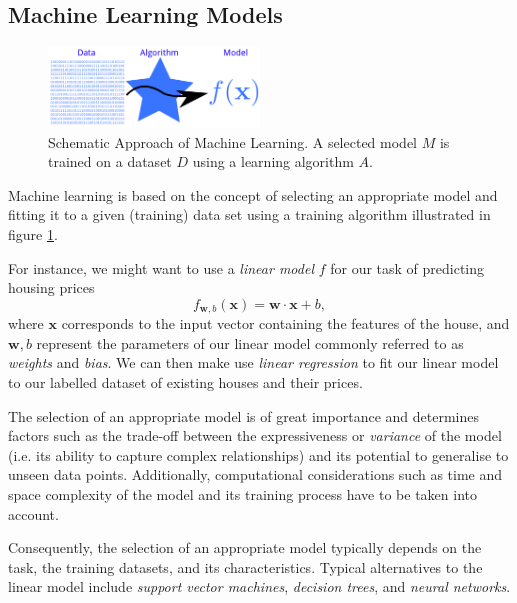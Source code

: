 \subsection{Machine Learning Models}
\begin{figure}[h]
	\caption{Schematic Approach of Machine Learning. A selected model $M$ is trained on a dataset $D$ using a learning algorithm $A$.} \label{fig:machine-learning-approach}
	\centering
	\includegraphics[width=0.5\textwidth]{figures/chapter-2/machine-learning-approach.png}
\end{figure} 

Machine learning is based on the concept of selecting an appropriate model and fitting it to a given (training) data set using a training algorithm illustrated in figure \ref{fig:machine-learning-approach}. 

For instance, we might want to use a \emph{linear model} $f$ for our task of predicting housing prices
\begin{equation}
f_{\mathbf{w}, b}(\mathbf{x}) = \mathbf{w}\cdot \mathbf{x} + b,
\end{equation}
where $\mathbf{x}$ corresponds to the input vector containing the features of the house, and $\mathbf{w}, b$ represent the parameters of our linear model commonly referred to as \emph{weights} and \emph{bias}. We can then make use \emph{linear regression} to fit our linear model to our labelled dataset of existing houses and their prices. 

The selection of an appropriate model is of great importance and determines factors such as the trade-off between the expressiveness or \emph{variance} of the model (i.e. its ability to capture complex relationships) and its potential to generalise to unseen data points. Additionally,  computational considerations such as time and space complexity of the model and its training process have to be taken into account. 

Consequently, the selection of an appropriate model typically depends on the task, the training datasets, and its characteristics. Typical alternatives to the linear model include \emph{support vector machines}, \emph{decision trees}, and \emph{neural networks}. 


